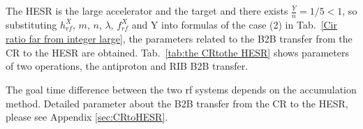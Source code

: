 The HESR is the large accelerator and the target and there exists $\frac{Y}{n}=1/5<1$, so substituting $h^X_\mathit{rf}$, $m$, $n$, $\lambda$, $f_{\mathit{rf}}^{X}$ and Y into formulas of the case (2) in Tab.~\ref{Cir ratio far from integer large}, the parameters related to the B2B transfer from the CR to the HESR are obtained. Tab.~\ref{tab:the CRtothe HESR} shows parameters of two operations, the antiproton and RIB B2B transfer.




The goal time difference between the two rf systems depends on the accumulation method. Detailed parameter about the B2B transfer from the CR to the HESR, please see Appendix \ref{sec:CRtoHESR}. 
